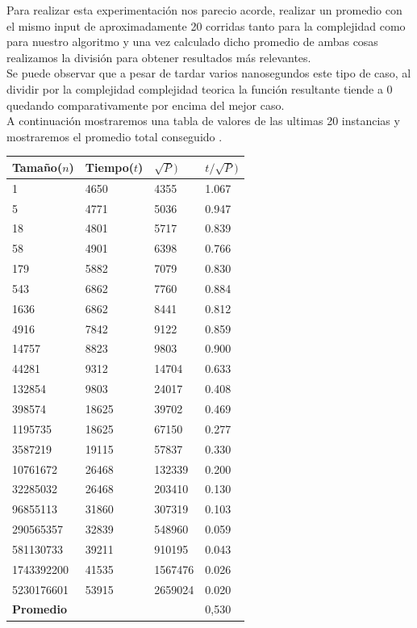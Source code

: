 Para realizar esta experimentaci\'on nos parecio acorde, realizar un promedio con el mismo input de aproximadamente 20 corridas
tanto para la complejidad como para nuestro algoritmo y una vez calculado dicho promedio de ambas cosas realizamos la divisi\'on para
obtener resultados m\'as relevantes.\\ 

Se puede observar que a pesar de tardar varios nanosegundos este tipo de caso, al dividir por la complejidad complejidad teorica
la función resultante tiende a 0 quedando comparativamente por encima del mejor caso.\\

A continuaci\'on mostraremos una tabla de valores de las ultimas 20 instancias y
mostraremos el promedio total conseguido .\\


\begin{table}[H]

    \begin{tabular}{ | l | l |l |l |}
    \hline
	Tamaño($n$) & Tiempo($t$) & \textbf{$\sqrt{P})$} & \textbf{$t/\sqrt{P})$}  \\ \hline
1 & 4650	 & 4355 &	1.067 \\ \hline
5 &	4771	 & 5036	& 0.947\\ \hline
18 &	4801	 & 5717	& 0.839\\ \hline
58 &	4901	 & 6398	& 0.766\\ \hline
179 &	5882	 & 7079	& 0.830\\ \hline
543	& 6862	&7760 &	0.884\\ \hline
1636	 & 6862 &	8441 &	0.812\\ \hline
4916	 & 7842	 & 9122 & 	 0.859\\ \hline
14757 &	8823	 & 9803 &	0.900\\ \hline
44281 &	9312	 & 14704 &	0.633\\ \hline
132854 &	 9803	 & 24017 &	0.408\\ \hline
398574 &	 18625 & 	39702 &	0.469\\ \hline
1195735 &	18625 &	67150 &	0.277\\ \hline
3587219	& 19115	& 57837&	 0.330\\ \hline
10761672 	& 26468 &	132339 & 	0.200\\ \hline
32285032	 &26468& 	 203410	& 0.130\\ \hline
96855113 & 	31860 &	307319 & 	0.103\\ \hline
290565357 &	32839 &	548960 &	 0.059\\ \hline
581130733 & 	39211 &	910195 &	 0.043\\ \hline
1743392200 &	41535 &	1567476 &	0.026\\ \hline
5230176601 &	53915 &	2659024	&0.020\\ \hline

    \textbf{Promedio} & & & 0,530 \\ \hline
    \end{tabular}
\end{table}

